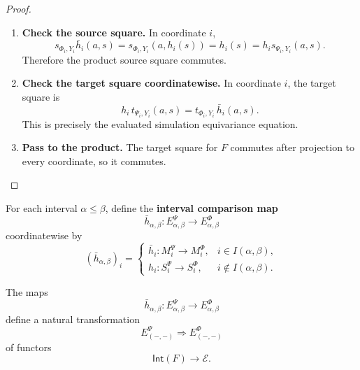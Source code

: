 \begin{proof}
    \leavevmode
    \begin{enumerate}
        \item \textbf{Check the source square.}
        In coordinate \(i\),
        \[
            s_{\Phi_i,Y_i}\bar h_i(a,s)
            =
            s_{\Phi_i,Y_i}(a,h_i(s))
            =
            h_i(s)
            =
            h_i s_{\Psi_i,Y_i}(a,s).
        \]
        Therefore the product source square commutes.

        \item \textbf{Check the target square coordinatewise.}
        In coordinate \(i\), the target square is
        \[
            h_i\,t_{\Psi_i,Y_i}(a,s)
            =
            t_{\Phi_i,Y_i}\,\bar h_i(a,s).
        \]
        This is precisely the evaluated simulation equivariance equation.

        \item \textbf{Pass to the product.}
        The target square for \(F\) commutes after projection to every
        coordinate, so it commutes.
    \end{enumerate}
\end{proof}

\begin{definition}
\label{def:cmett-interval-comparison-induced-simulations}
    For each interval \(\alpha\leq\beta\), define the
    \textbf{interval comparison map}
    \[
        \bar h_{\alpha,\beta}:E_{\alpha,\beta}^{\Psi}
        \to
        E_{\alpha,\beta}^{\Phi}
    \]
    coordinatewise by
    \[
        (\bar h_{\alpha,\beta})_i
        =
        \begin{cases}
        \bar h_i:M_i^\Psi\to M_i^\Phi,
            & i\in I(\alpha,\beta),\\[2pt]
        h_i:S_i^\Psi\to S_i^\Phi,
            & i\notin I(\alpha,\beta).
        \end{cases}
    \]
\end{definition}

\begin{theorem}
\label{thm:cmett-simulations-act-on-interval-cubical-execution}
    The maps
    \[
        \bar h_{\alpha,\beta}:E_{\alpha,\beta}^{\Psi}
        \to
        E_{\alpha,\beta}^{\Phi}
    \]
    define a natural transformation
    \[
        E^\Psi_{(-,-)}
        \Longrightarrow
        E^\Phi_{(-,-)}
    \]
    of functors
    \[
        \mathsf{Int}(F)\to\mathcal E.
    \]
\end{theorem}

